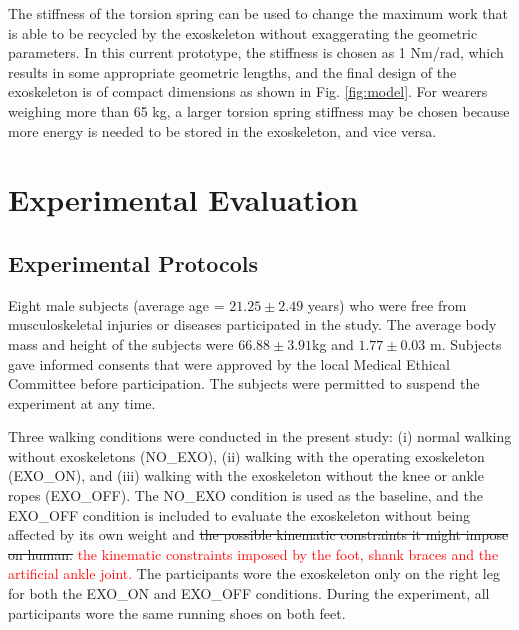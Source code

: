 \documentclass[twocolumn,cleanfoot,10pt]{asme2ej}
\begin{document}

The stiffness of the torsion spring can be used to change the maximum work that is able to be recycled by the exoskeleton without exaggerating the geometric parameters.
In this current prototype, the stiffness is chosen as 1 Nm/rad, which results in some appropriate geometric lengths, and the final design of the exoskeleton is of compact dimensions as shown in Fig. \ref{fig:model}.
For wearers weighing more than 65 kg, a larger torsion spring stiffness may be chosen because more energy is needed to be stored in the exoskeleton, and vice versa.

\section{Experimental Evaluation}
\label{sec:experiment}  

\subsection{Experimental Protocols}

Eight male subjects (average age = $21.25 \pm2.49$ years) who were free from musculoskeletal injuries or diseases participated in the study.
The average body mass and height of the subjects were $66.88\pm3.91$kg and $1.77\pm0.03$ m.
Subjects gave informed consents that were approved by the local Medical Ethical Committee before participation.
The subjects were permitted to suspend the experiment at any time. 

Three walking conditions were conducted in the present study: (i) normal walking without exoskeletons (NO\_EXO), (ii) walking with the operating exoskeleton (EXO\_ON), and (iii) walking with the exoskeleton without the knee or ankle ropes (EXO\_OFF).
The NO\_EXO condition is used as the baseline, and the EXO\_OFF condition is included to evaluate the exoskeleton without being affected by its own weight and \sout{the possible kinematic constraints it might impose on human.} \textcolor{red}{the kinematic constraints imposed by the foot, shank braces and the artificial ankle joint.}
The participants wore the exoskeleton only on the right leg for both the EXO\_ON and EXO\_OFF conditions.
During the experiment, all participants wore the same running shoes on both feet. 
\end{document}
